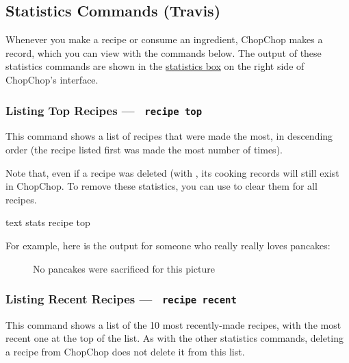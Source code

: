 
\pagebreak
\hypertarget{GroupStatsCommands}{}
\subsection{Statistics Commands (Travis)}

Whenever you make a recipe or consume an ingredient, ChopChop makes a record, which you can view with the commands below.
The output of these statistics commands are shown in the \hyperlink{StatisticsBox}{statistics box} on the right side of
ChopChop's interface.


\hypertarget{StatsRecipeTopCommand}{}
\subsubsection{Listing Top Recipes — \texttt{ recipe top}}

	This command shows a list of recipes that were made the most, in descending order (the recipe listed first was made the most
	number of times).

	Note that, even if a recipe was deleted (with \hyperlink{DeleteRecipeCommand}{}, its cooking records will still
	exist in ChopChop. To remove these statistics, you can use \hyperlink{StatsRecipeClearCommand}{} to clear
	them for all recipes.

	 \begin{blockofcode}{text}
		stats recipe top
	\end{blockofcode}

	For example, here is the output for someone who really really loves pancakes:

	\begin{figure}[!htbp]\centering
		\caption{No pancakes were sacrificed for this picture}
	\end{figure}






\pagebreak
\hypertarget{StatsRecipeRecentCommand}{}
\subsubsection{Listing Recent Recipes — \texttt{ recipe recent}}

	This command shows a list of the 10 most recently-made recipes, with the most recent one at the top of the list. As with the other
	statistics commands, deleting a recipe from ChopChop does not delete it from this list.

